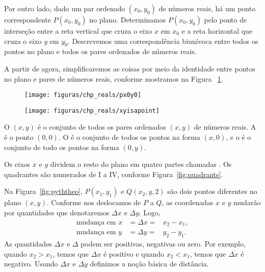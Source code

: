 \documentclass{svmono}
\begin{document}
Por outro lado, dado um par ordenado $(x_0,y_0)$ de números reais, há um
ponto correspondente $P(x_0,y_0)$ no plano. Determinamos $P(x_0,y_0)$ pelo
ponto de interseção entre a reta vertical que cruza o eixo $x$ em $x_0$
e a reta horizontal que cruza o eixo $y$ em $y_0$. Descrevemos uma
correspondência biunívoca entre todos os pontos no plano e todos os
pares ordenados de números reais.

A partir de agora, simplificaremos as coisas por meio da identidade entre
pontos no plano e pares de números reais, conforme mostramos na Figura%
~\ref{fig:identidadepontos}.

\begin{figure}
\begin{minipage}[b]{2.2in}
\texttt{[image: figuras/chp\_reals/px0y0]}
\caption{}
\label{fig:coordP}
\end{minipage}%
\hfill%
\begin{minipage}[b]{2.25in}
\texttt{[image: figuras/chp\_reals/xyisapoint]}
\caption{}
\label{fig:identidadepontos}
\end{minipage}
\end{figure}

\begin{defin}
O  $(x,y)$ é o conjunto de todos os pares ordenados $(x,y)$
de números reais. A  é o ponto $(0,0)$. O 
é o conjunto de todos os pontos na forma $(x,0)$, e o  é
o conjunto de todo os pontos na forma $(0,y)$. 
\end{defin}

Os eixos $x$ e $y$ dividem o resto do plano em quatro partes chamadas
. Os quadrantes são numerados de I a IV, conforme
Figura~\ref{fig:quadrants}.

Na Figura~\ref{fig:pyththeo}, $P(x_1,y_1)$ e $Q(x_2,y,2)$ são dois
pontos diferentes no plano $(x,y)$. Conforme nos deslocamos de $P$
a $Q$, as coordenadas $x$ e $y$ mudarão por quantidades que
denotaremos $\Delta x$ e $\Delta y$. Logo,
\begin{eqnarray*}
\text{mudança em } x & = \Delta x = & x_2 - x_1, \\
\text{mudança em } y & = \Delta y = & y_2 - y_1.
\end{eqnarray*}
As quantidades $\Delta x$ e $\Delta$ podem ser positivas, negativas ou
zero. Por exemplo, quando $x_2 > x_1$, temos que $\Delta x$ é positivo
e quando $x_2 < x_1$, temos que $\Delta x$ é negativo. Usando $\Delta x$
e $\Delta y$ definimos a noção básica de distância.
\end{document}
